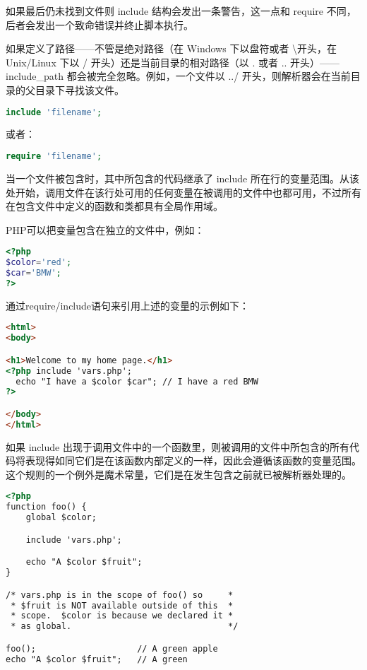 如果最后仍未找到文件则 include 结构会发出一条警告，这一点和 require 不同，后者会发出一个致命错误并终止脚本执行。

如果定义了路径——不管是绝对路径（在 Windows 下以盘符或者 \textbackslash 开头，在 Unix/Linux 下以 / 开头）还是当前目录的相对路径（以 . 或者 .. 开头）——include\_path 都会被完全忽略。例如，一个文件以 ../ 开头，则解析器会在当前目录的父目录下寻找该文件。

\begin{lstlisting}[language=PHP]
include 'filename';
\end{lstlisting}

或者：

\begin{lstlisting}[language=PHP]
require 'filename';
\end{lstlisting}

当一个文件被包含时，其中所包含的代码继承了 include 所在行的变量范围。从该处开始，调用文件在该行处可用的任何变量在被调用的文件中也都可用，不过所有在包含文件中定义的函数和类都具有全局作用域。





PHP可以把变量包含在独立的文件中，例如：

\begin{lstlisting}[language=PHP]
<?php
$color='red';
$car='BMW';
?>
\end{lstlisting}


通过require/include语句来引用上述的变量的示例如下：


\begin{lstlisting}[language=HTML]
<html>
<body>

<h1>Welcome to my home page.</h1>
<?php include 'vars.php';
  echo "I have a $color $car"; // I have a red BMW
?>

</body>
</html>
\end{lstlisting}

如果 include 出现于调用文件中的一个函数里，则被调用的文件中所包含的所有代码将表现得如同它们是在该函数内部定义的一样，因此会遵循该函数的变量范围。这个规则的一个例外是魔术常量，它们是在发生包含之前就已被解析器处理的。

\begin{lstlisting}[language=HTML]
<?php
function foo() {
    global $color;

    include 'vars.php';

    echo "A $color $fruit";
}

/* vars.php is in the scope of foo() so     *
 * $fruit is NOT available outside of this  *
 * scope.  $color is because we declared it *
 * as global.                               */

foo();                    // A green apple
echo "A $color $fruit";   // A green
\end{lstlisting}


